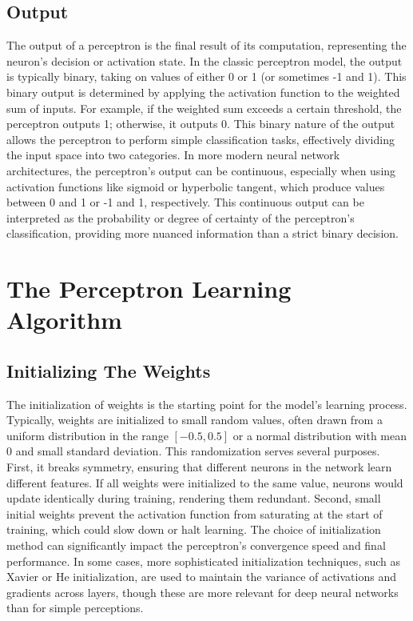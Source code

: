 \subsection{Output}
The output of a perceptron is the final result of its computation, representing the neuron's decision or activation state. In the classic perceptron model, the output is typically binary, taking on values of either 0 or 1 (or sometimes -1 and 1). This binary output is determined by applying the activation function to the weighted sum of inputs. For example, if the weighted sum exceeds a certain threshold, the perceptron outputs 1; otherwise, it outputs 0. This binary nature of the output allows the perceptron to perform simple classification tasks, effectively dividing the input space into two categories. In more modern neural network architectures, the perceptron's output can be continuous, especially when using activation functions like sigmoid or hyperbolic tangent, which produce values between 0 and 1 or -1 and 1, respectively. This continuous output can be interpreted as the probability or degree of certainty of the perceptron's classification, providing more nuanced information than a strict binary decision.

\section{The Perceptron Learning Algorithm}
\subsection{Initializing The Weights}
The initialization of weights is the starting point for the model's learning process. Typically, weights are initialized to small random values, often drawn from a uniform distribution in the range $[-0.5, 0.5]$ or a normal distribution with mean 0 and small standard deviation. This randomization serves several purposes. First, it breaks symmetry, ensuring that different neurons in the network learn different features. If all weights were initialized to the same value, neurons would update identically during training, rendering them redundant. Second, small initial weights prevent the activation function from saturating at the start of training, which could slow down or halt learning. The choice of initialization method can significantly impact the perceptron's convergence speed and final performance. In some cases, more sophisticated initialization techniques, such as Xavier or He initialization, are used to maintain the variance of activations and gradients across layers, though these are more relevant for deep neural networks than for simple perceptions.

